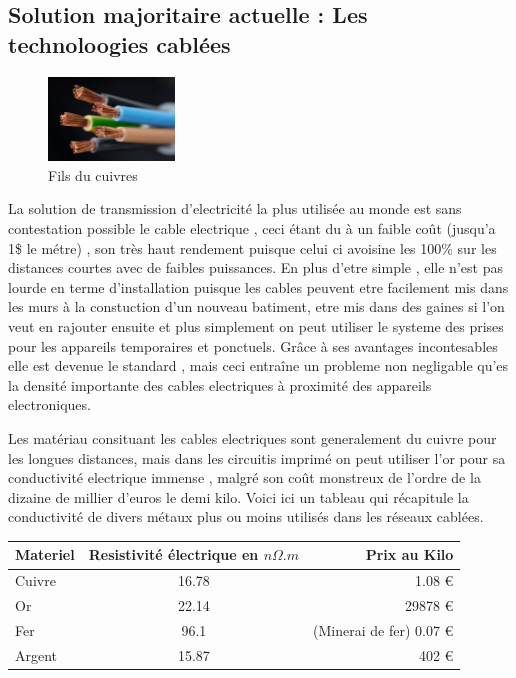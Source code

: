\documentclass[11pt]{report}
\begin{document}
\subsection{Solution majoritaire actuelle : Les technoloogies cablées}
\begin{figure}
  \begin{center}
    \includegraphics[width=0.3\textwidth]{copperWire}
  \end{center}
  \caption{Fils du cuivres}
\end{figure} La solution de transmission d'electricité la plus utilisée au monde est sans contestation possible le cable electrique , ceci étant du à un faible coût (jusqu'a 1\$ le métre) , son très haut rendement puisque celui ci avoisine les 100\% sur les distances courtes avec de faibles puissances. En plus d'etre simple , elle n'est pas lourde en terme d'installation puisque les cables peuvent etre facilement mis dans les murs à la constuction d'un nouveau batiment, etre mis dans des gaines si l'on veut en rajouter ensuite et plus simplement on peut utiliser le systeme des prises pour les appareils temporaires et ponctuels. Grâce à ses avantages incontesables elle est devenue le standard , mais ceci entraîne un probleme non negligable qu'es la densité importante des cables electriques à proximité des appareils electroniques.
	
	Les matériau consituant les cables electriques sont generalement du cuivre pour les longues distances, mais dans les circuitis imprimé on peut utiliser l'or pour sa conductivité electrique immense , malgré son coût monstreux de l'ordre de la dizaine de millier d'euros le demi kilo. Voici ici un tableau qui récapitule la conductivité de divers métaux plus ou moins utilisés dans les réseaux cablées.

\begin{center}
\begin{tabular}{| l | c | r |}
	\hline
	Materiel & Resistivité électrique en \( n\Omega .m \)& Prix au Kilo \\
	\hline
	Cuivre & 16.78 & 1.08 \euro{}  \\
	Or & 22.14 & 29878 \euro{}  \\
	Fer & 96.1 & (Minerai de fer) 0.07 \euro{}  \\
	Argent & 15.87 & 402 \euro{}  \\
	\hline
\end{tabular}
\end{center}
\end{document}
